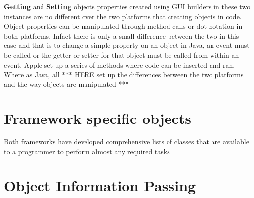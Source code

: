\documentclass[a4paper,14pt]{article}
\begin{document}
\textbf{Getting} and \textbf{Setting} objects properties created using GUI builders in these two instances are no different over the two platforms that creating objects in code. Object properties can be manipulated through method calls or dot notation in both platforms. Infact there is only a small difference between the two in this case and that is to change a simple property on an object in Java, an event must be called or the getter or setter for that object must be called from within an event. Apple set up a series of methods where code can be inserted and ran. Where as Java, all ***  HERE set up the differences between the two platforms and the way objects are manipulated ***


\section{Framework specific objects} %
\label{sec:framework_specific_objects}
Both frameworks have developed comprehensive lists of classes that are available to a programmer to perform almost any required tasks

\section{Object Information Passing} %
\label{sec:object_information_passing}


\newpage
\scriptsize{}

\end{document}
